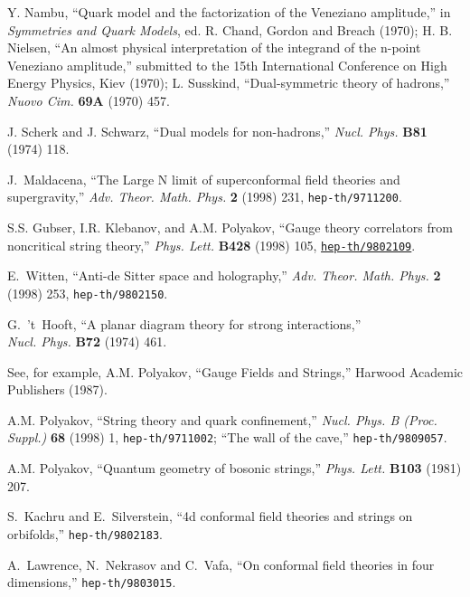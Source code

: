 \begin{thebibliography}{99}
\baselineskip=14.5pt
\frenchspacing

Y. Nambu, ``Quark model and the factorization of the Veneziano amplitude,''
in {\em Symmetries and Quark Models}, ed. R. Chand, Gordon and Breach
(1970);
H. B. Nielsen, ``An almost physical interpretation of the integrand
of the n-point Veneziano amplitude,'' submitted to the 15th
International Conference on High Energy Physics, Kiev (1970);
L. Susskind, ``Dual-symmetric theory of hadrons,''
{\em Nuovo Cim.} {\bf 69A} (1970) 457.

J. Scherk and J. Schwarz, ``Dual models for non-hadrons,''
{\em Nucl. Phys.} {\bf B81} (1974) 118.

J.~Maldacena, ``The Large N limit of superconformal field theories and
supergravity,'' {\em Adv. Theor. Math. Phys.} {\bf 2} (1998) 231, 
{{\tt hep-th/9711200}}.

S.S. Gubser, I.R. Klebanov, and A.M. Polyakov, ``Gauge theory correlators
  from noncritical string theory,''
{\em Phys. Lett.} {\bf B428} (1998) 105,
  \href{http://xxx.lanl.gov/abs/hep-th/9802109}{{\tt hep-th/9802109}}.

E.~Witten, ``Anti-de Sitter space and holography,''
{\em Adv. Theor. Math. Phys.} {\bf 2} (1998) 253,
{{\tt hep-th/9802150}}.

G.~'t~Hooft, ``A planar diagram theory for strong interactions,'' \\ 
{\em Nucl. Phys.} {\bf B72} (1974) 461.

See, for example,
A.M. Polyakov, ``Gauge Fields and Strings,'' Harwood Academic Publishers
(1987).

A.M. Polyakov, ``String theory and quark confinement,''
{\it Nucl. Phys. B (Proc. Suppl.)} {\bf 68} (1998) 1, {{\tt hep-th/9711002}};
``The wall of the cave,'' {{\tt hep-th/9809057}}.

A.M. Polyakov, ``Quantum geometry of bosonic strings,'' 
{\em Phys. Lett.} {\bf B103} (1981) 207.

S.~Kachru and E.~Silverstein, ``4d conformal field theories and
strings on orbifolds,''
{{\tt hep-th/9802183}}.

A.~Lawrence, N.~Nekrasov and C.~Vafa, ``On conformal field theories
in four dimensions,''
{{\tt hep-th/9803015}}.


\end{thebibliography}
